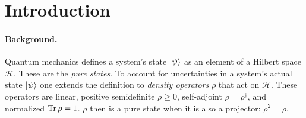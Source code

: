 \documentclass[draft,nofootinbib,pre,twocolumn,showpacs,showkeys,groupaddress,preprintnumbers,floatfix]{revtex4-1}
\newcommand{\1}{\mathbbm{1}}
\begin{document}

\date{\today}


\begin{abstract}
\ourAbstract
\end{abstract}

\keywords{\ourKeywords}



\date{\today}
\maketitle





\section{Introduction}
\label{sec:Intro}

\paragraph*{Background.} Quantum mechanics defines a system's state $\ket{\psi}$ as an 
element of a Hilbert space $\mathcal{H}$. These are the \emph{pure states}. To account for
uncertainties in a system's actual state $\ket{\psi}$ one extends the
definition to \emph{density operators} $\rho$ that act on $\mathcal{H}$. These
operators are linear, positive semidefinite $\rho \geq 0$, self-adjoint $\rho =
\rho^\dagger$, and normalized $\Tr \rho = 1$. $\rho$ then is a pure state when
it is also a projector: $\rho^2 = \rho$.
\end{document}
